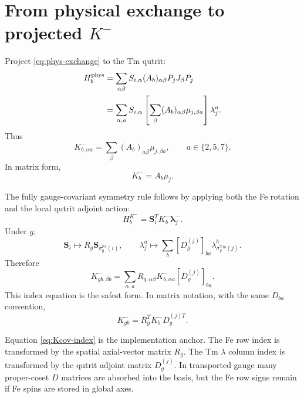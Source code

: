 \documentclass[11pt,a4paper]{article}
\newcommand{\Fe}{\mathrm{Fe}}
\newcommand{\Tm}{\mathrm{Tm}}
\newcommand{\ve}[1]{\boldsymbol{#1}}
\newcommand{\lvecminus}{\boldsymbol{\lambda}^{-}}
\begin{document}
\section{From physical exchange to projected $K^-$}

Project \cref{eq:phys-exchange} to the Tm qutrit:
\begin{align}
  H_b^{\rm phys}
  &=\sum_{\alpha\beta}S_{i,\alpha}(A_b)_{\alpha\beta}P_jJ_\beta P_j\\
  &=\sum_{\alpha,a}S_{i,\alpha}\left[\sum_\beta(A_b)_{\alpha\beta}\mu_{j,\beta a}\right]\lambda_j^a.
\end{align}
Thus
\begin{equation}
  \boxed{
  K^-_{b,\alpha a}=\sum_\beta(A_b)_{\alpha\beta}\mu_{j,\beta a},
  \qquad a\in\{2,5,7\}.}
  \label{eq:K-from-A-mu}
\end{equation}
In matrix form,
\begin{equation}
  \boxed{K_b^-=A_b\mu_j.}
\end{equation}

The fully gauge-covariant symmetry rule follows by applying both the Fe rotation and the local qutrit adjoint action:
\begin{equation}
  H_b^{K^-}=\ve S_i^T K_b^-\lvecminus_j.
\end{equation}
Under $g$,
\begin{equation}
  \ve S_i\mapsto R_g\ve S_{\sigma_g^\Fe(i)},
  \qquad
  \lambda_j^a\mapsto\sum_b\left[D_g^{(j)}\right]_{ba}\lambda_{\sigma_g^\Tm(j)}^b.
\end{equation}
Therefore
\begin{equation}
  \boxed{
  K^-_{gb,\beta b}=\sum_{\alpha,a}R_{g,\alpha\beta}K^-_{b,\alpha a}\left[D_g^{(j)}\right]_{ba}.}
  \label{eq:Kcov-index}
\end{equation}
This index equation is the safest form.  In matrix notation, with the same $D_{ba}$ convention,
\begin{equation}
  \boxed{K^-_{gb}=R_g^TK^-_bD_g^{(j)T}.}
  \label{eq:Kcov-matrix}
\end{equation}

\begin{implbox}
Equation \eqref{eq:Kcov-index} is the implementation anchor.  The Fe row index is transformed by the spatial axial-vector matrix $R_g$.  The Tm $\lambda$ column index is transformed by the qutrit adjoint matrix $D_g^{(j)}$.  In transported gauge many proper-coset $D$ matrices are absorbed into the basis, but the Fe row signs remain if Fe spins are stored in global axes.
\end{implbox}
\end{document}
